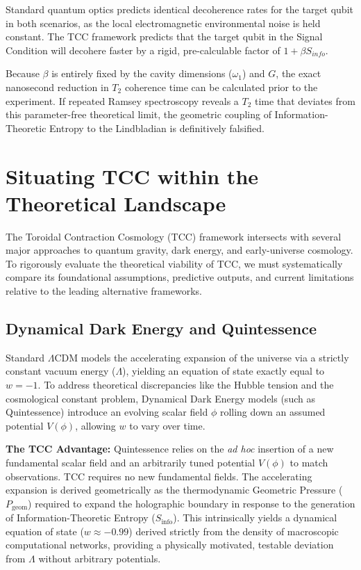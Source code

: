 \documentclass[12pt,openany]{book}
\theoremstyle{plain}
\theoremstyle{definition}
\theoremstyle{remark}
\begin{document}
Standard quantum optics predicts identical decoherence rates for the target qubit in both scenarios, as the local electromagnetic environmental noise is held constant. The TCC framework predicts that the target qubit in the Signal Condition will decohere faster by a rigid, pre-calculable factor of $1 + \beta S_{info}$. 

Because $\beta$ is entirely fixed by the cavity dimensions ($\omega_1$) and $G$, the exact nanosecond reduction in $T_2$ coherence time can be calculated prior to the experiment. If repeated Ramsey spectroscopy reveals a $T_2$ time that deviates from this parameter-free theoretical limit, the geometric coupling of Information-Theoretic Entropy to the Lindbladian is definitively falsified.

\chapter{Situating TCC within the Theoretical Landscape}

The Toroidal Contraction Cosmology (TCC) framework intersects with several major approaches to quantum gravity, dark energy, and early-universe cosmology. To rigorously evaluate the theoretical viability of TCC, we must systematically compare its foundational assumptions, predictive outputs, and current limitations relative to the leading alternative frameworks.

\section{Dynamical Dark Energy and Quintessence}

Standard $\Lambda$CDM models the accelerating expansion of the universe via a strictly constant vacuum energy ($\Lambda$), yielding an equation of state exactly equal to $w = -1$. To address theoretical discrepancies like the Hubble tension and the cosmological constant problem, Dynamical Dark Energy models (such as Quintessence) introduce an evolving scalar field $\phi$ rolling down an assumed potential $V(\phi)$, allowing $w$ to vary over time.

\textbf{The TCC Advantage:} Quintessence relies on the \textit{ad hoc} insertion of a new fundamental scalar field and an arbitrarily tuned potential $V(\phi)$ to match observations. TCC requires no new fundamental fields. The accelerating expansion is derived geometrically as the thermodynamic Geometric Pressure ($P_{\text{geom}}$) required to expand the holographic boundary in response to the generation of Information-Theoretic Entropy ($S_{\text{info}}$). This intrinsically yields a dynamical equation of state ($w \approx -0.99$) derived strictly from the density of macroscopic computational networks, providing a physically motivated, testable deviation from $\Lambda$ without arbitrary potentials.
\end{document}
